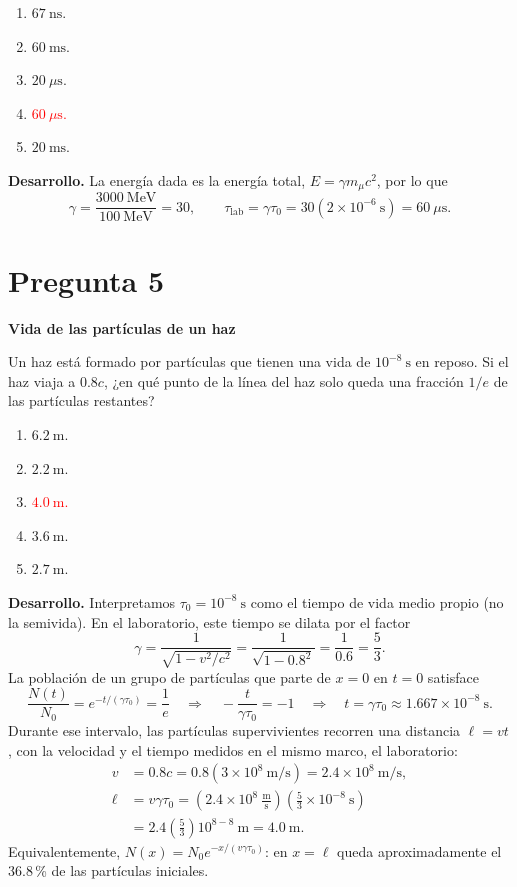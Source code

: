 \documentclass[a4paper,11pt]{article}
\newcommand{\pregunta}[2]{\section*{Pregunta #1}\textbf{#2}\par}
\begin{document}
\begin{enumerate}
    \item $67\ \mathrm{ns}$.
    \item $60\ \mathrm{ms}$.
    \item $20\ \mu\mathrm{s}$.
    \item \textcolor{red}{$60\ \mu\mathrm{s}$.}
    \item $20\ \mathrm{ms}$.
\end{enumerate}

\begin{figure}[H]
\centering

\end{figure}

\textbf{Desarrollo.} La energía dada es la energía total, $E=\gamma m_\mu c^2$, por lo que
\[
\gamma=\frac{3000\ \mathrm{MeV}}{100\ \mathrm{MeV}}=30,
\qquad
\tau_{\mathrm{lab}}=\gamma\tau_0
=30(2\times10^{-6}\ \mathrm{s})=60\ \mu\mathrm{s}.
\]
\parencite[Sec. 3.1, pp. 81--83; Sec. 3.1.2.1, pp. 86--87]{chaparro2026}

\pregunta{5}{Vida de las partículas de un haz}

Un haz está formado por partículas que tienen una vida de $10^{-8}\ \mathrm{s}$ en reposo. Si el haz viaja a $0.8c$, ¿en qué punto de la línea del haz solo queda una fracción $1/e$ de las partículas restantes?

\begin{enumerate}
    \item $6.2\ \mathrm{m}$.
    \item $2.2\ \mathrm{m}$.
    \item \textcolor{red}{$4.0\ \mathrm{m}$.}
    \item $3.6\ \mathrm{m}$.
    \item $2.7\ \mathrm{m}$.
\end{enumerate}

\textbf{Desarrollo.} Interpretamos $\tau_0=10^{-8}\ \mathrm{s}$ como el tiempo de vida medio propio (no la semivida). En el laboratorio, este tiempo se dilata por el factor
\[
\gamma=\frac{1}{\sqrt{1-v^2/c^2}}
=\frac{1}{\sqrt{1-0.8^2}}=\frac{1}{0.6}=\frac53.
\]
La población de un grupo de partículas que parte de $x=0$ en $t=0$ satisface
\[
\frac{N(t)}{N_0}=e^{-t/(\gamma\tau_0)}=\frac1e
\quad\Longrightarrow\quad
-\frac{t}{\gamma\tau_0}=-1
\quad\Longrightarrow\quad
 t=\gamma\tau_0\approx1.667\times10^{-8}\ \mathrm{s}.
\]
Durante ese intervalo, las partículas supervivientes recorren una distancia $\ell=vt$, con la velocidad y el tiempo medidos en el mismo marco, el laboratorio:
\[
\begin{aligned}
v&=0.8c=0.8(3\times10^8\ \mathrm{m/s})=2.4\times10^8\ \mathrm{m/s},\\
\ell&=v\gamma\tau_0
=\left(2.4\times10^8\ \frac{\mathrm{m}}{\mathrm{s}}\right)
\left(\frac53\times10^{-8}\ \mathrm{s}\right)\\
&=2.4\left(\frac53\right)10^{8-8}\ \mathrm{m}
=\boxed{4.0\ \mathrm{m}}.
\end{aligned}
\]
Equivalentemente, $N(x)=N_0e^{-x/(v\gamma\tau_0)}$: en $x=\ell$ queda aproximadamente el $36.8$\,\% de las partículas iniciales. \parencite[Sec. 3.1.2.1, pp. 86--87]{chaparro2026}
\end{document}

